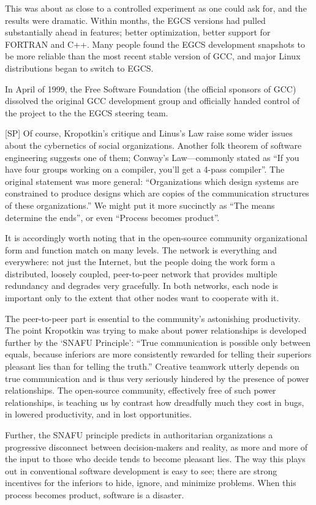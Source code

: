 \documentclass[a4paper,12pt,UTF8,twoside]{ctexbook}
\begin{document}
This was about as close to a controlled experiment as one could ask for, and the results were dramatic. Within months, the EGCS versions had pulled substantially ahead in features; better optimization, better support for FORTRAN and C++. Many people found the EGCS development snapshots to be more reliable than the most recent stable version of GCC, and major Linux distributions began to switch to EGCS.

In April of 1999, the Free Software Foundation (the official sponsors of GCC) dissolved the original GCC development group and officially handed control of the project to the the EGCS steering team.

[SP] Of course, Kropotkin's critique and Linus's Law raise some wider issues about the cybernetics of social organizations. Another folk theorem of software engineering suggests one of them; Conway's Law—commonly stated as ``If you have four groups working on a compiler, you'll get a 4-pass compiler''. The original statement was more general: ``Organizations which design systems are constrained to produce designs which are copies of the communication structures of these organizations.'' We might put it more succinctly as ``The means determine the ends'', or even ``Process becomes product''.

It is accordingly worth noting that in the open-source community organizational form and function match on many levels. The network is everything and everywhere: not just the Internet, but the people doing the work form a distributed, loosely coupled, peer-to-peer network that provides multiple redundancy and degrades very gracefully. In both networks, each node is important only to the extent that other nodes want to cooperate with it.

The peer-to-peer part is essential to the community's astonishing productivity. The point Kropotkin was trying to make about power relationships is developed further by the `SNAFU Principle': ``True communication is possible only between equals, because inferiors are more consistently rewarded for telling their superiors pleasant lies than for telling the truth.'' Creative teamwork utterly depends on true communication and is thus very seriously hindered by the presence of power relationships. The open-source community, effectively free of such power relationships, is teaching us by contrast how dreadfully much they cost in bugs, in lowered productivity, and in lost opportunities.

Further, the SNAFU principle predicts in authoritarian organizations a progressive disconnect between decision-makers and reality, as more and more of the input to those who decide tends to become pleasant lies. The way this plays out in conventional software development is easy to see; there are strong incentives for the inferiors to hide, ignore, and minimize problems. When this process becomes product, software is a disaster.
\end{document}
